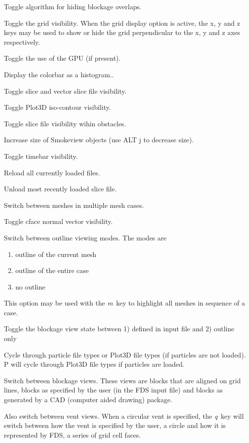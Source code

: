 \documentclass[11pt,twoside]{book}
\newcommand{\kitem}[1]{\item[{\bf {\tt #1 \  }} \hfill]}
\begin{document}
\kitem{F}Toggle algorithm for hiding blockage overlaps.

\kitem{g}Toggle the grid visibility.  When the grid display option
is active, the x, y and z keys may be used to show or hide the
grid perpendicular to the x, y and z axes respectively.

\kitem{G}Toggle the use of the GPU (if present).

\kitem{h}Display the colorbar as a histogram..

\kitem{H}Toggle slice and vector slice file  visibility.

\kitem{i}Toggle Plot3D iso-contour visibility.

\kitem{I}Toggle slice file visibility wihin obstacles.

\kitem{j,J}Increase size of Smokeview objects (use ALT j to decrease size).

\kitem{k,K}Toggle timebar visibility.

\kitem{l}Reload all currently loaded files.

\kitem{L}Unload most recently loaded slice file.


\kitem{m,M}Switch between meshes in multiple mesh cases.

\kitem{n,N}Toggle cface normal vector visibility.

\kitem{o}Switch between outline viewing modes. The modes are
\begin{enumerate}
\item outline of the current mesh
\item outline of the entire case
\item no outline
\end{enumerate}
This option may be used with the {\em m}\ key to highlight all meshes in sequence of a case.

\kitem{O}Toggle the blockage view state between 1) defined in input file and 2) outline only

\kitem{p, P}Cycle through particle file types or Plot3D file types (if particles are not loaded).
P will cycle through Plot3D file types if particles are loaded.

\kitem{q}Switch between blockage views.  These views are blocks
that are aligned on grid lines, blocks as specified by the user
(in the FDS input file) and blocks as generated by a CAD (computer
aided drawing) package.

Also switch between vent views.  When a circular vent is specified,
the {\em q}\ key will switch between how the vent is specified by the user, a circle
and how it is represented by FDS, a series of grid cell faces.
\end{document}
